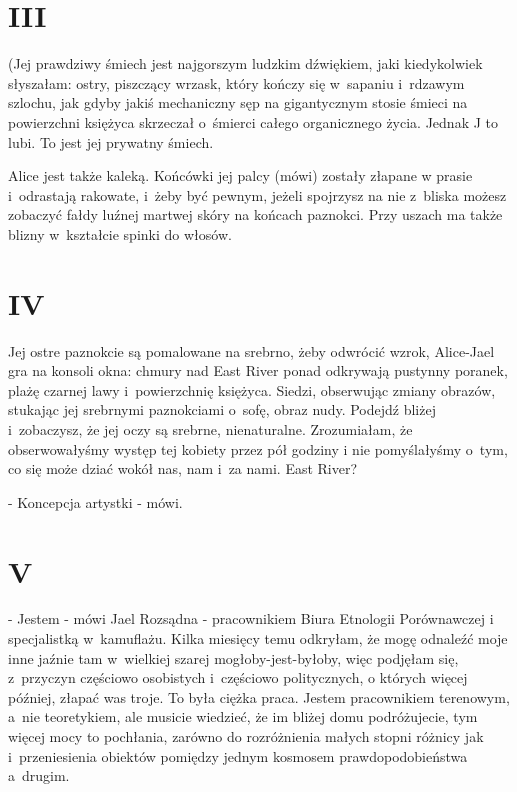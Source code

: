 \documentclass[oneside,polish,12pt,sfheadings]{mwbk}
\begin{document}
\chapter{III}

(Jej prawdziwy śmiech jest najgorszym ludzkim dźwiękiem, jaki kiedykolwiek
słyszałam: ostry, piszczący wrzask, który kończy się w~sapaniu i~rdzawym
szlochu, jak gdyby jakiś mechaniczny sęp na gigantycznym stosie śmieci
na powierzchni księżyca skrzeczał o~śmierci całego organicznego życia.
Jednak J to lubi. To jest jej prywatny śmiech.

Alice jest także kaleką. Końcówki jej palcy (mówi) zostały złapane
w prasie i~odrastają rakowate, i~żeby być pewnym, jeżeli spojrzysz
na nie z~bliska możesz zobaczyć fałdy luźnej martwej skóry na końcach
paznokci. Przy uszach ma także blizny w~kształcie spinki do włosów.

\chapter{IV}

Jej ostre paznokcie są pomalowane na srebrno, żeby odwrócić wzrok, Alice-Jael
gra na konsoli okna: chmury nad East River ponad odkrywają pustynny
poranek, plażę czarnej lawy i~powierzchnię księżyca. Siedzi, obserwując
zmiany obrazów, stukając jej srebrnymi paznokciami o~sofę, obraz nudy.
Podejdź bliżej i~zobaczysz, że jej oczy są srebrne, nienaturalne.
Zrozumiałam, że obserwowałyśmy występ tej kobiety przez pół godziny
i nie pomyślałyśmy o~tym, co się może dziać wokół nas, nam i~za nami.
East River?

- Koncepcja artystki - mówi.

\chapter{V}

- Jestem - mówi Jael Rozsądna - pracownikiem Biura Etnologii Porównawczej
i specjalistką w~kamuflażu. Kilka miesięcy temu odkryłam, że mogę
odnaleźć moje inne jaźnie tam w~wielkiej szarej mogłoby-jest-byłoby,
więc podjęłam się, z~przyczyn częściowo osobistych i~częściowo politycznych,
o których więcej później, złapać was troje. To była ciężka praca.
Jestem pracownikiem terenowym, a~nie teoretykiem, ale musicie wiedzieć,
że im bliżej domu podróżujecie, tym więcej mocy to pochłania, zarówno
do rozróżnienia małych stopni różnicy jak i~przeniesienia obiektów
pomiędzy jednym kosmosem prawdopodobieństwa a~drugim.
\end{document}
